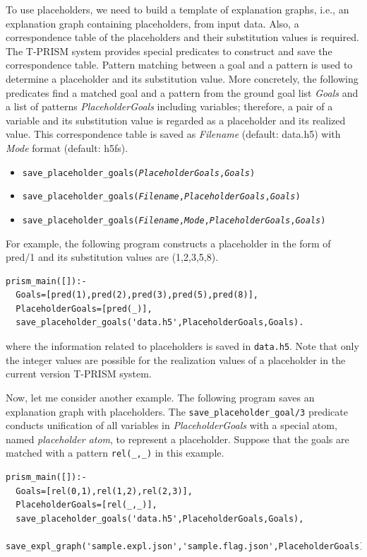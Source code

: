 \documentclass[a4paper]{report}
\begin{document}
To use placeholders, we need to build a template of explanation graphs, i.e., an explanation graph containing placeholders, from input data.
Also, a correspondence table of the placeholders and their substitution values is required. 
The T-PRISM system provides special predicates to construct and save the correspondence table.
Pattern matching between a goal and a pattern is used to determine a placeholder and its substitution value.
More concretely, the following predicates find a matched goal and a pattern from the ground goal list {\it Goals} and a list of patterns {\it PlaceholderGoals} including variables; therefore,
a pair of a variable and its substitution value is regarded as a placeholder and its realized value. This correspondence table is saved as {\it Filename} (default: data.h5) with {\it Mode} format (default: h5fs).

\begin{itemize}
	\item {\tt save\_placeholder\_goals({\it PlaceholderGoals},{\it Goals})}
	\item {\tt save\_placeholder\_goals({\it Filename},{\it PlaceholderGoals},{\it Goals})}
	\item {\tt save\_placeholder\_goals({\it Filename},{\it Mode},{\it PlaceholderGoals},{\it Goals})}
\end{itemize}

For example, the following program constructs a placeholder in the form of pred/1 and its substitution values are (1,2,3,5,8).
\begin{verbatim}
prism_main([]):-
  Goals=[pred(1),pred(2),pred(3),pred(5),pred(8)],
  PlaceholderGoals=[pred(_)],
  save_placeholder_goals('data.h5',PlaceholderGoals,Goals).
\end{verbatim}
where the information related to placeholders is saved in {\tt data.h5}.
Note that only the integer values are possible for the realization values of a placeholder in the current version T-PRISM system.

Now, let me consider another example.
The following program saves an explanation graph with placeholders.
The {\tt save\_placeholder\_goal/3} predicate conducts unification of all variables in {\it PlaceholderGoals} with a special atom, named {\it placeholder atom}, to represent a placeholder.
Suppose that the goals are matched with a pattern {\tt rel(\_,\_)} in this example.
\begin{verbatim}
prism_main([]):-
  Goals=[rel(0,1),rel(1,2),rel(2,3)],
  PlaceholderGoals=[rel(_,_)],
  save_placeholder_goals('data.h5',PlaceholderGoals,Goals),
  save_expl_graph('sample.expl.json','sample.flag.json',PlaceholderGoals).
\end{verbatim}
\end{document}
